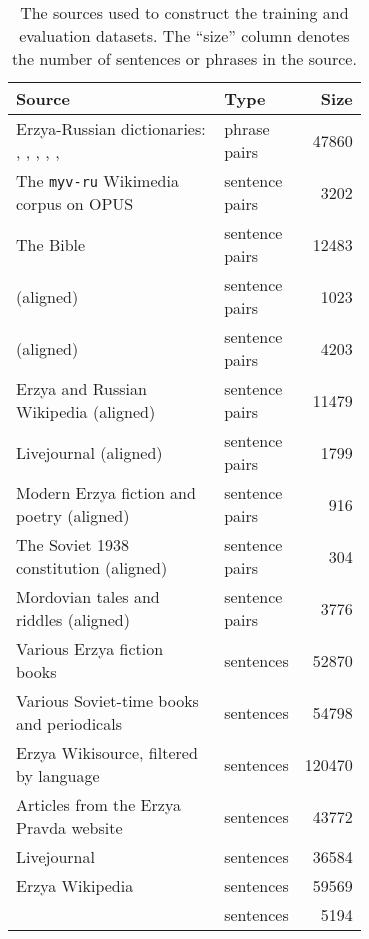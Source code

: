 \documentclass[11pt]{article}
\begin{document}
\begin{table*}[ht!]
\begin{tabular}{|p{0.7\linewidth}|l|r|}
\hline
Source                          & Type           & Size   \\
\hline
Erzya-Russian dictionaries: \citet{marlamuter}, \citet{mordovians},   \citet{mordvarf},  \citet{ryabov2021},   \citet{schankina2011}, \citet{erushov} & phrase pairs   & 47860 \\
\hline
The \texttt{myv-ru} Wikimedia corpus on   OPUS \cite{tiedemann-2012-parallel}                                             & sentence pairs & 3202  \\
The Bible \cite{finugorbib}                                    & sentence pairs & 12483  \\
\citet{sheyanova2017} (aligned)                                & sentence pairs & 1023   \\
\citet{bryzhinsky2009} (aligned)                               & sentence pairs & 4203   \\
Erzya and Russian Wikipedia   \cite{wikidump} (aligned)        & sentence pairs & 11479  \\
Livejournal \cite{lj} (aligned)                                & sentence pairs & 1799   \\
Modern Erzya fiction and poetry   \cite{rus4all} (aligned)     & sentence pairs & 916    \\
The Soviet 1938 constitution \cite{const}   (aligned)          & sentence pairs & 304    \\
Mordovian tales and riddles   \cite{evsenyev} (aligned)        & sentence pairs & 3776   \\
\hline
Various Erzya fiction books   \cite{emordovia}                 & sentences      & 52870  \\
Various Soviet-time books and periodicals   \cite{fennougrica} & sentences      & 54798  \\
Erzya Wikisource, filtered by language   \cite{wikisource}     & sentences      & 120470 \\
Articles from the Erzya Pravda website   \cite{pravda}         & sentences      & 43772  \\
Livejournal \cite{lj}                                          & sentences      & 36584  \\
Erzya Wikipedia \cite{wikidump}                                & sentences      & 59569  \\
\citet{bryzhinsky2009}                                         & sentences      & 5194    \\
\hline
\end{tabular}
\caption{\label{tab:sources} The sources used to construct the training and evaluation datasets. The ``size'' column denotes the number of sentences or phrases in the source.}

\end{table*}
\end{document}
